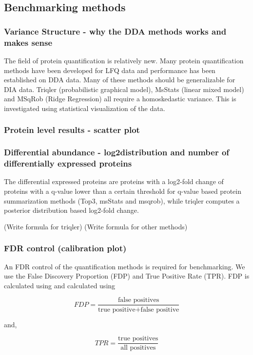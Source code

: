 \documentclass[10pt,letterpaper]{article}
\begin{document}
\subsection*{Benchmarking methods}

\subsubsection*{Variance Structure - why the DDA methods works and makes sense}
The field of protein quantification is relatively new. Many protein quantification methods have been developed for LFQ data and performance has been established on DDA data. Many of these methods should be generalizable for DIA data. Triqler (probabilistic graphical model), MsStats (linear mixed model) and MSqRob (Ridge Regression) all require a homoskedastic variance. This is investigated using statistical visualization of the data.

\subsubsection*{Protein level results - scatter plot}

\subsubsection*{Differential abundance - log2distribution and number of differentially expressed proteins}
The differential expressed proteins are proteins with a log2-fold change of proteins with a q-value lower than a certain threshold for q-value based protein summarization methods (Top3, msStats and msqrob), while triqler computes a posterior distribution based  log2-fold change. 

(Write formula for triqler)
(Write formula for other methods)

\subsubsection*{FDR control (calibration plot)}
An FDR control of the quantification methods is required for benchmarking. We use the False Discovery Proportion (FDP) and True Positive Rate (TPR). FDP is calculated using and calculated using 

	\[FDP = \frac{ \text{false positives}}{\text{true positive} + \text{false positive}} \]

and,

	\[TPR = \frac{\text{true positives}}{\text{all positives}} \]
\end{document}
